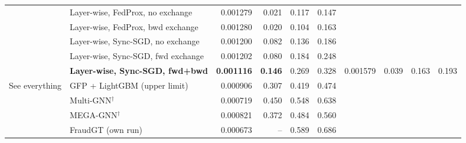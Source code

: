 \documentclass[11pt,a4paper]{article}
\begin{document}
\begin{table}[p]
{\begin{tabular}{llrrrr@{\hspace{14pt}}rrrr}
& Layer-wise, FedProx, no exchange & 0.001279 & 0.021 & 0.117 & 0.147 & & & & \\
& Layer-wise, FedProx, bwd exchange & 0.001280 & 0.020 & 0.104 & 0.163 & & & & \\
& Layer-wise, Sync-SGD, no exchange & 0.001200 & 0.082 & 0.136 & 0.186 & & & & \\
& Layer-wise, Sync-SGD, fwd exchange & 0.001202 & 0.080 & 0.184 & 0.248 & & & & \\
& \textbf{Layer-wise, Sync-SGD, fwd+bwd} & \textbf{0.001116} & \textbf{0.146} & 0.269 & 0.328 & 0.001579 & 0.039 & 0.163 & 0.193 \\
\midrule
See everything & GFP + LightGBM (upper limit) & 0.000906 & 0.307 & 0.419 & 0.474 & & & & \\
& Multi-GNN$^\dagger$ & 0.000719 & 0.450 & 0.548 & 0.638 & & & & \\
& MEGA-GNN$^\dagger$ & 0.000821 & 0.372 & 0.484 & 0.560 & & & & \\
& FraudGT (own run) & 0.000673 & -- & 0.589 & 0.686 & & & & \\
\bottomrule
\end{tabular}}
\end{table}
\end{document}
